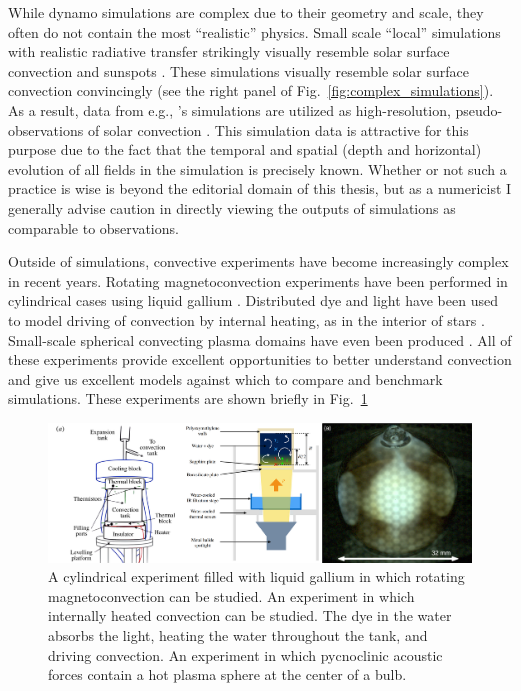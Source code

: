 While dynamo simulations are complex due to their geometry and scale, they often do not contain the most ``realistic'' physics.
Small scale ``local'' simulations with realistic radiative transfer strikingly visually resemble solar surface convection and sunspots \citep{stein&nordlund1998, rempel&all2009, stein&nordlund2012, rempel2014}.
These simulations visually resemble solar surface convection convincingly (see the right panel of Fig.~\ref{fig:complex_simulations}).
As a result, data from e.g., \cite{rempel2014}'s simulations are utilized as high-resolution, pseudo-observations of solar convection \cite[see e.g.,][and others]{vankooten&cranmer2017, shchukina&trujillo2019}.
This simulation data is attractive for this purpose due to the fact that the temporal and spatial (depth and horizontal) evolution of all fields in the simulation is precisely known.
Whether or not such a practice is wise is beyond the editorial domain of this thesis, but as a numericist I generally advise caution in directly viewing the outputs of simulations as comparable to observations.

Outside of simulations, convective experiments have become increasingly complex in recent years.
Rotating magnetoconvection experiments have been performed in cylindrical cases using liquid gallium \citep{aurnou&all2018}.
Distributed dye and light have been used to model driving of convection by internal heating, as in the interior of stars \citep{bouillaut&all2019}.
Small-scale spherical convecting plasma domains have even been produced \citep{koulakis&all2018}.
All of these experiments provide excellent opportunities to better understand convection and give us excellent models against which to compare and benchmark simulations.
These experiments are shown briefly in Fig.~\ref{fig:convective_experiments}

\begin{figure}[t!]
\vspace{0.25cm}
\includegraphics[width=\textwidth]{./figs/intro/convective_experiments.pdf}
\caption[Modern convective laboratory experiments.]
{
	\citep[left, Fig.~1a of][]{aurnou&all2018} A cylindrical experiment filled with liquid gallium in which rotating magnetoconvection can be studied.
	\citep[middle, Fig.~1a of][]{bouillaut&all2019} An experiment in which internally heated convection can be studied.
	The dye in the water absorbs the light, heating the water throughout the tank, and driving convection.
	\citep[right, Fig.~3a of][]{koulakis&all2018} An experiment in which pycnoclinic acoustic forces contain a hot plasma sphere at the center of a bulb.
	\label{fig:convective_experiments} 
}
\end{figure}


